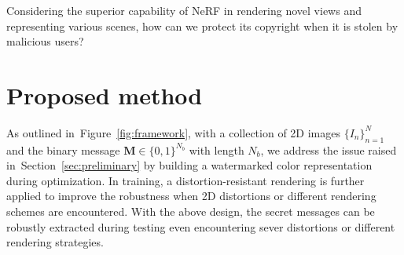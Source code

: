 \documentclass[10pt,twocolumn,letterpaper]{article}
\newcommand{\Fref}[1]{Figure~\ref{#1}}
\newcommand{\Sref}[1]{Section~\ref{#1}}
\def\M{{\mathbf{M}}}
\begin{document}
Considering the superior capability of NeRF in rendering novel views and representing various scenes, how can we protect its copyright when it is stolen by malicious users?



\section{Proposed method}

As outlined in~\Fref{fig:framework}, with a collection of 2D images $\{I_n\}_{n=1}^N$ and the binary message $\M \in \{0,1\}^{N_b}$ with length $N_b$, we address the issue raised in~\Sref{sec:preliminary} by building a watermarked color representation during optimization. In training, a distortion-resistant rendering is further applied to improve the robustness when 2D distortions or different rendering schemes are encountered. With the above design, the secret messages can be robustly extracted during testing even 
encountering sever distortions or different rendering strategies.
\end{document}
